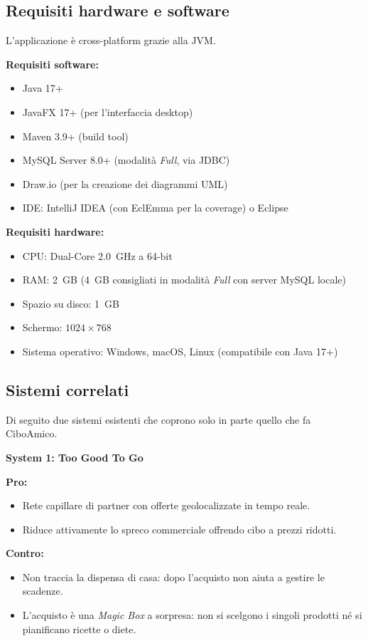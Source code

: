 \subsection{Requisiti hardware e software}
\label{subsec:requisiti_hw_sw}

L'applicazione è cross-platform grazie alla JVM.

\textbf{Requisiti software:}
\begin{itemize}
    \item Java 17+
    \item JavaFX 17+ (per l'interfaccia desktop)
    \item Maven 3.9+ (build tool)
    \item MySQL Server 8.0+ (modalità \textit{Full}, via JDBC)
    \item Draw.io (per la creazione dei diagrammi UML)
    \item IDE: IntelliJ IDEA (con EclEmma per la coverage) o Eclipse
\end{itemize}

\textbf{Requisiti hardware:}
\begin{itemize}
    \item CPU: Dual-Core 2.0~GHz a 64-bit
    \item RAM: 2~GB (4~GB consigliati in modalità \textit{Full} con server MySQL locale)
    \item Spazio su disco: 1~GB
    \item Schermo: $1024\times768$
    \item Sistema operativo: Windows, macOS, Linux (compatibile con Java 17+)
\end{itemize}

\subsection{Sistemi correlati}
\label{subsec:relazionati}

Di seguito due sistemi esistenti che coprono solo in parte quello che fa CiboAmico.

\textbf{System 1: Too Good To Go}

\textbf{Pro:}
\begin{itemize}
    \item Rete capillare di partner con offerte geolocalizzate in tempo reale.
    \item Riduce attivamente lo spreco commerciale offrendo cibo a prezzi ridotti.
\end{itemize}

\textbf{Contro:}
\begin{itemize}
    \item Non traccia la dispensa di casa: dopo l'acquisto non aiuta a gestire le scadenze.
    \item L'acquisto è una \emph{Magic Box} a sorpresa: non si scelgono i singoli prodotti né si pianificano ricette o diete.
\end{itemize}


